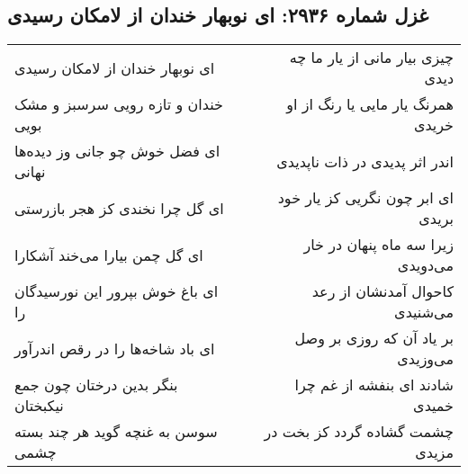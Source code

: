 \begin{center}
\section*{غزل شماره ۲۹۳۶: ای نوبهار خندان از لامکان رسیدی}
\label{sec:2936}
\begin{longtable}{l p{0.5cm} r}
ای نوبهار خندان از لامکان رسیدی
&&
چیزی بیار مانی از یار ما چه دیدی
\\
خندان و تازه رویی سرسبز و مشک بویی
&&
همرنگ یار مایی یا رنگ از او خریدی
\\
ای فضل خوش چو جانی وز دیده‌ها نهانی
&&
اندر اثر پدیدی در ذات ناپدیدی
\\
ای گل چرا نخندی کز هجر بازرستی
&&
ای ابر چون نگریی کز یار خود بریدی
\\
ای گل چمن بیارا می‌خند آشکارا
&&
زیرا سه ماه پنهان در خار می‌دویدی
\\
ای باغ خوش بپرور این نورسیدگان را
&&
کاحوال آمدنشان از رعد می‌شنیدی
\\
ای باد شاخه‌ها را در رقص اندرآور
&&
بر یاد آن که روزی بر وصل می‌وزیدی
\\
بنگر بدین درختان چون جمع نیکبختان
&&
شادند ای بنفشه از غم چرا خمیدی
\\
سوسن به غنچه گوید هر چند بسته چشمی
&&
چشمت گشاده گردد کز بخت در مزیدی
\\
\end{longtable}
\end{center}
